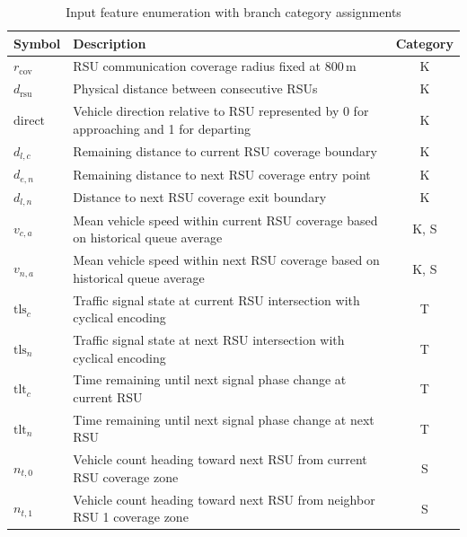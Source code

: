 \documentclass[journal]{IEEEtran}
\begin{document}
\begin{table}[!t]
  \renewcommand{\arraystretch}{1.1}
  \caption{Input feature enumeration with branch category assignments}
  \label{tab:features}
  \centering
  \begin{tabular}{@{}lp{5.0cm}c@{}}
    \toprule
    \textbf{Symbol} & \textbf{Description} & \textbf{Category} \\
    \midrule
    $r_{\text{cov}}$          & RSU communication coverage radius fixed at 800\,m                            & K \\
    $d_{\text{rsu}}$          & Physical distance between consecutive RSUs                                   & K \\
    $\text{direct}$           & Vehicle direction relative to RSU represented by 0 for approaching and 1 for departing      & K \\
    $d_{l,c}$                 & Remaining distance to current RSU coverage boundary                          & K \\
    $d_{e,n}$                 & Remaining distance to next RSU coverage entry point                          & K \\
    $d_{l,n}$                 & Distance to next RSU coverage exit boundary                                  & K \\
    $v_{c,a}$                 & Mean vehicle speed within current RSU coverage based on historical queue average    & K, S \\
    $v_{n,a}$                 & Mean vehicle speed within next RSU coverage based on historical queue average       & K, S \\
    $\text{tls}_{c}$          & Traffic signal state at current RSU intersection with cyclical encoding       & T \\
    $\text{tls}_{n}$          & Traffic signal state at next RSU intersection with cyclical encoding          & T \\
    $\text{tlt}_{c}$          & Time remaining until next signal phase change at current RSU                 & T \\
    $\text{tlt}_{n}$          & Time remaining until next signal phase change at next RSU                    & T \\
    $n_{t,0}$                 & Vehicle count heading toward next RSU from current RSU coverage zone         & S \\
    $n_{t,1}$                 & Vehicle count heading toward next RSU from neighbor RSU 1 coverage zone      & S \\

\end{tabular}
\end{table}
\end{document}
